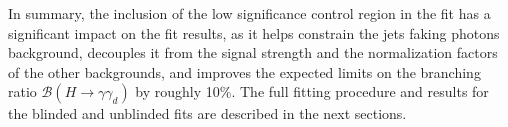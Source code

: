 In summary, the inclusion of the low \ETmiss significance control region in the fit has a significant impact on the fit results, as it helps constrain the jets faking photons background, decouples it from the signal strength and the normalization factors of the other backgrounds, and improves the expected limits on the branching ratio $\mathcal{B}(H\to\gamma\gamma_d)$ by roughly 10\%.
The full fitting procedure and results for the blinded and unblinded fits are described in the next sections.

